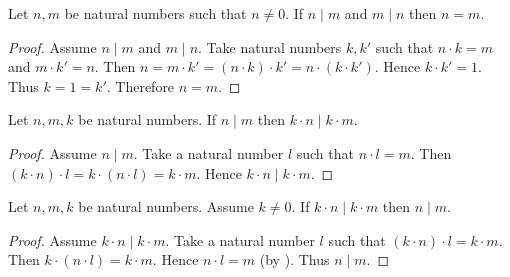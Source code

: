 \documentclass[10pt]{article}
\begin{document}
  \begin{forthel}
    \begin{proposition}[id=ARITHMETIC_07_4933275640397824,printid]
      Let $n, m$ be natural numbers such that $n \neq 0$.
      If $n \mid m$ and $m \mid n$ then $n = m$.
    \end{proposition}
    \begin{proof}
      Assume $n \mid m$ and $m \mid n$.
      Take natural numbers $k,k'$ such that $n \cdot k = m$ and $m \cdot k' = n$.
      Then $n
        = m \cdot k'
        = (n \cdot k) \cdot k'
        = n \cdot (k \cdot k')$.
      Hence $k \cdot k' = 1$.
      Thus $k = 1 = k'$.
      Therefore $n = m$.
    \end{proof}
  \end{forthel}

  \begin{forthel}
    \begin{proposition}[id=ARITHMETIC_07_1283495225720832,printid]
      Let $n, m, k$ be natural numbers.
      If $n \mid m$ then $k \cdot n \mid k \cdot m$.
    \end{proposition}
    \begin{proof}
      Assume $n \mid m$.
      Take a natural number $l$ such that $n \cdot l = m$.
      Then $(k \cdot n) \cdot l
        = k \cdot (n \cdot l)
        = k \cdot m$.
      Hence $k \cdot n \mid k \cdot m$.
    \end{proof}
  \end{forthel}

  \begin{forthel}
    \begin{proposition}[id=ARITHMETIC_07_6469492028735488,printid]
      Let $n, m, k$ be natural numbers.
      Assume $k \neq 0$.
      If $k \cdot n \mid k \cdot m$ then $n \mid m$.
    \end{proposition}
    \begin{proof}
      Assume $k \cdot n \mid k \cdot m$.
      Take a natural number $l$ such that $(k \cdot n) \cdot l = k \cdot m$.
      Then $k \cdot (n \cdot l) = k \cdot m$.
      Hence $n \cdot l = m$ (by ).
      Thus $n \mid m$.
    \end{proof}
  \end{forthel}
\end{document}
